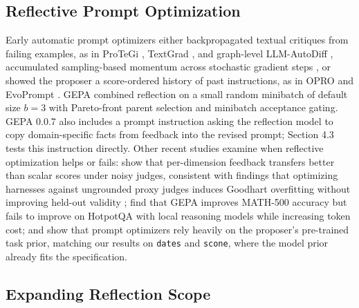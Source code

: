 \documentclass[10pt]{article}
\begin{document}
\hypertarget{reflective-prompt-optimization}{%
\subsection{Reflective Prompt
Optimization}\label{reflective-prompt-optimization}}

Early automatic prompt optimizers either backpropagated textual
critiques from failing examples, as in ProTeGi
\citep{pryzant2023automatic}, TextGrad \citep{yuksekgonul2024textgrad},
and graph-level LLM-AutoDiff \citep{yin2025llmautodiff}, accumulated
sampling-based momentum across stochastic gradient steps
\citep{ding2026scaling}, or showed the proposer a score-ordered history
of past instructions, as in OPRO \citep{yang2023large} and EvoPrompt
\citep{guo2023evoprompt}. GEPA \citep{a2025gepa} combined reflection on
a small random minibatch of default size \(b=3\) with Pareto-front
parent selection and minibatch acceptance gating. GEPA 0.0.7 also
includes a prompt instruction asking the reflection model to copy
domain-specific facts from feedback into the revised prompt; Section 4.3
tests this instruction directly. Other recent studies examine when
reflective optimization helps or fails: \citet{lumer2026reflective} show
that per-dimension feedback transfers better than scalar scores under
noisy judges, consistent with findings that optimizing harnesses against
ungrounded proxy judges induces Goodhart overfitting without improving
held-out validity \citep{yang2026ideationgoodhart};
\citet{giummarra2026understanding} find that GEPA improves MATH-500
accuracy but fails to improve on HotpotQA with local reasoning models
while increasing token cost; and \citet{ma2024large} show that prompt
optimizers rely heavily on the proposer's pre-trained task prior,
matching our results on \texttt{dates} and \texttt{scone}, where the
model prior already fits the specification.

\hypertarget{expanding-reflection-scope}{%
\subsection{Expanding Reflection
Scope}\label{expanding-reflection-scope}}
\end{document}
